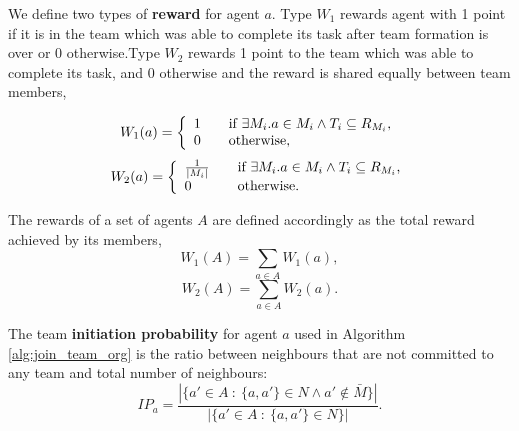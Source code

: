 \documentclass{llncs}
\begin{document}
\begin{definition}
We define two types of \textbf{reward} for agent $a$. Type $W_1$ rewards agent with 1 point if it is in the team which was able to complete its task after team formation is over or 0 otherwise.Type $W_2$ rewards 1 point to the team which was able to complete its task, and 0 otherwise and the reward is shared equally between team members,

\begin{equation}
W_1(a) = \left\{
  \begin{array}{l l}
    1 & \quad \text{if $\exists M_i . a \in M_i \wedge T_i \subseteq R_{M_i}$,}\\
    0 & \quad \text{otherwise,}\\
  \end{array} \right.
\label{eq:w1agent}
\end{equation}
\begin{equation}
W_2(a) = \left\{
  \begin{array}{l l}
    \frac{1}{|M_i|} & \quad \text{if $\exists M_i . a \in M_i \wedge T_i \subseteq R_{M_i}$,}\\
    0 & \quad \text{otherwise.}\\
  \end{array} \right.
\label{eq:w2agent}
\end{equation}

The rewards of a set of agents $A$ are defined accordingly as the total reward achieved by its members,
\begin{equation}
 W_1(A) = \sum_{a \in A} W_1(a),
\label{eq:w1organisation}
\end{equation}
\begin{equation}
 W_2(A) = \sum_{a \in A} W_2(a).
\label{eq:w2organisation}
\end{equation}

\end{definition}


\begin{definition}
The team \textbf{initiation probability} for agent $a$ used in Algorithm \ref{alg:join_team_org} is the ratio between neighbours that are not committed to any team and total number of neighbours:
\begin{equation}
IP_a = \frac{|\{ a' \in A\ :\ \{a, a'\} \in N \wedge a' \notin \bar{M}  \}|}{|\{ a' \in A\ :\ \{a, a'\} \in N \}|}.
\label{eq:init_prob}
\end{equation}
\end{definition}
\end{document}
